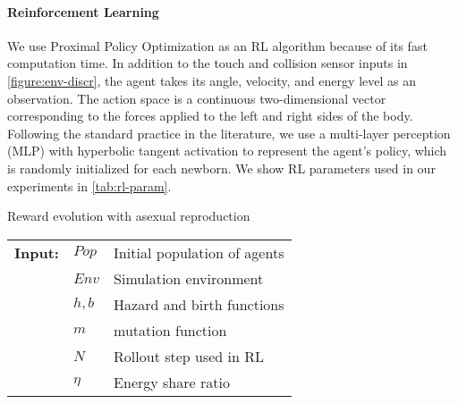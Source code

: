 \paragraph{Reinforcement Learning}
We use Proximal Policy Optimization \citep{schulmanProximalPolicyOptimization2017} as an RL algorithm because of its fast computation time. In addition to the touch and collision sensor inputs in \cref{figure:env-discr}, the agent takes its angle, velocity, and energy level as an observation. The action space is a continuous two-dimensional vector corresponding to the forces applied to the left and right sides of the body. Following the standard practice in the literature, we use a multi-layer perception (MLP) with hyperbolic tangent activation to represent the agent's policy, which is randomly initialized for each newborn. We show RL parameters used in our experiments in \cref{tab:rl-param}.

\begin{algorithm}[!htb]
  \caption{Reward evolution with asexual reproduction}\label{alg:reward-evo}
  \begin{tabular}{lll}
    \textbf{Input:} & $Pop$ & Initial population of agents \\
                    & $Env$ & Simulation environment \\
                    & $h, b$ & Hazard and birth functions \\
                    & $m$ & mutation function \\
                    & $N$ & Rollout step used in RL \\
                    & $\eta$ & Energy share ratio
  \end{tabular}
  \begin{algorithmic}[1]
    \Loop{}
      \EndOnce{}
    \EndFor{}
       
      \EndWith{}
       
      \EndWith{}
    \EndFor{}
  \EndLoop{}
\end{algorithmic}
\end{algorithm}

